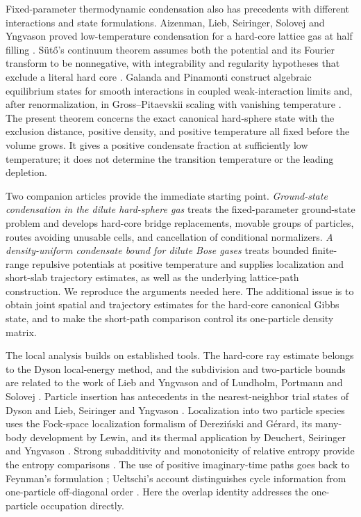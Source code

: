 Fixed-parameter thermodynamic condensation also has precedents with different
interactions and state formulations.  Aizenman, Lieb, Seiringer, Solovej and
Yngvason proved low-temperature condensation for a hard-core lattice gas at
half filling \citep{AizenmanLiebSeiringerSolovejYngvason2004}.  S\"ut\H{o}'s
continuum theorem assumes both the potential and its Fourier transform to be
nonnegative, with integrability and regularity hypotheses that exclude a
literal hard core \citep[Theorem~1.2]{Suto2023TwoStep}.  Galanda and Pinamonti
construct algebraic equilibrium states for smooth interactions in coupled
weak-interaction limits and, after renormalization, in Gross--Pitaevskii
scaling with vanishing temperature
\citep{GalandaPinamonti2025Equilibrium,GalandaPinamonti2026GP}.
The present theorem concerns the exact canonical hard-sphere state with the
exclusion distance, positive density, and positive temperature all fixed
before the volume grows.  It gives a positive condensate fraction at
sufficiently low temperature; it does not determine the transition
temperature or the leading depletion.

Two companion articles provide the immediate starting point.
\emph{Ground-state condensation in the dilute hard-sphere gas}
\citep{HS} treats the fixed-parameter ground-state problem and develops
hard-core bridge replacements, movable groups of particles, routes avoiding
unusable cells, and cancellation of conditional normalizers.
\emph{A density-uniform condensate bound for dilute Bose gases}
\citep{B} treats bounded finite-range repulsive potentials at positive
temperature and supplies localization and short-slab trajectory estimates,
as well as the underlying lattice-path construction.  We reproduce the
arguments needed here.  The additional issue is to obtain joint spatial and
trajectory estimates for the hard-core canonical Gibbs state, and to make
the short-path comparison control its one-particle density matrix.

The local analysis builds on established tools.  The hard-core ray estimate
belongs to the Dyson local-energy method, and the subdivision and
two-particle bounds are related to the work of Lieb and Yngvason and of
Lundholm, Portmann and Solovej
\citep{Dyson1957,LiebYngvason1998,LundholmPortmannSolovej2015}.
Particle insertion has antecedents in the nearest-neighbor trial states of
Dyson and Lieb, Seiringer and Yngvason
\citep{Dyson1957,LiebSeiringerYngvason2000}.
Localization into two particle species uses the Fock-space localization
formalism of Derezi\'nski and G\'erard, its many-body development by Lewin,
and its thermal application by Deuchert, Seiringer and Yngvason
\citep{DerezinskiGerard1999,Lewin2011,DeuchertSeiringerYngvason2019}.
Strong subadditivity and monotonicity of relative entropy provide the
entropy comparisons \citep{LiebRuskai1973Entropy,Lindblad1975}.
The use of positive imaginary-time paths goes back to Feynman's formulation
\citep{Feynman1953AtomicLambda}; Ueltschi's account distinguishes cycle
information from one-particle off-diagonal order
\citep{Ueltschi2006FeynmanCycles}.  Here the overlap identity addresses the
one-particle occupation directly.

